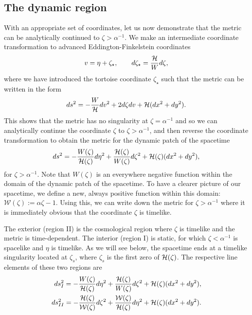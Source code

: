 \subsection{The dynamic region}

With an appropriate set of coordinates, let us now demonstrate that the metric can be analytically continued to $\zeta > \alpha^{-1}$. We make an intermediate coordinate transformation to advanced Eddington-Finkelstein coordinates
\begin{equation*}
  v = \eta + \zeta_\star, \qquad d\zeta_\star = \frac{{\cal H}}{W}d\zeta,
\end{equation*}
where we have introduced the tortoise coordinate $\zeta_\star$ such that the metric can be written in the form
\begin{equation*}
 ds^2 =  - \frac{W}{{\cal H}} dv^2 + 2 d\zeta dv + {\cal H} (dx^2 + dy^2).
\end{equation*}
This shows that the metric has no singularity at $\zeta = \alpha^{-1}$ and so we can analytically continue the coordinate $\zeta$ to $\zeta > \alpha^{-1}$, and then reverse the coordinate transformation to obtain the metric for the dynamic patch of the spacetime
\begin{equation*}
    ds^2 = - \frac{{W(\zeta)}}{{\cal H}(\zeta)} d\eta^2 + \frac{{\cal H}(\zeta)}{{W(\zeta)}} d \zeta^2 + {\cal H}(\zeta) (dx^2 + dy^2),
\end{equation*}
for $\zeta > \alpha^{-1}$. Note that $W(\zeta)$ is an everywhere negative function within the domain of the dynamic patch of the spacetime. To have a clearer picture of our spacetime, we define a new, always positive function within this domain: $\mathcal{W}(\zeta) := \alpha \zeta - 1$. Using this, we can write down the metric for $\zeta > \alpha^{-1}$ where it is immediately obvious that the coordinate $\zeta$ is timelike. 

The exterior (region II) is the cosmological region where $\zeta$ is timelike and the metric is time-dependent. The interior (region I) is static, for which $\zeta<\alpha^{-1}$ is spacelike and $\eta$ is timelike. As we will see below, the spacetime ends at a timelike singularity located at $\zeta_s$, where $\zeta_s$ is the first zero of ${\cal H}(\zeta)$. The respective line elements of these two regions are
\begin{equation}
\label{eq:4chargenew}
\begin{aligned}
    ds^2_{I} = - \frac{{W(\zeta)}}{{\cal H}(\zeta)} d\eta^2 + \frac{{\cal H}(\zeta)}{{W(\zeta)}} d \zeta^2 + {\cal H}(\zeta) (dx^2 + dy^2), \\
    ds^2_{II} = - \frac{{\cal H}(\zeta)}{{\mathcal{W}(\zeta)}} d \zeta^2 + \frac{{\mathcal{W}(\zeta)}}{{\cal H}(\zeta)} d\eta^2 + {\cal H}(\zeta) (dx^2 + dy^2). \\
\end{aligned}
\end{equation}

